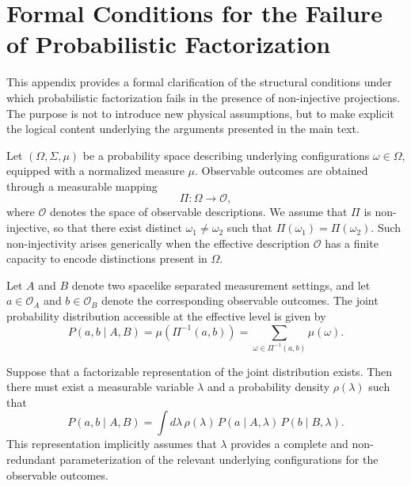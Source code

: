 \appendix
\section{Formal Conditions for the Failure of Probabilistic Factorization}
  \label{app:factorization}

  This appendix provides a formal clarification of the structural conditions under
  which probabilistic factorization fails in the presence of non-injective projections.
  The purpose is not to introduce new physical assumptions, but to make explicit the
  logical content underlying the arguments presented in the main text.

  Let $(\Omega,\Sigma,\mu)$ be a probability space describing underlying configurations
  $\omega \in \Omega$, equipped with a normalized measure $\mu$.
  Observable outcomes are obtained through a measurable mapping
  \begin{equation}
    \Pi : \Omega \rightarrow \mathcal{O},
  \end{equation}
  where $\mathcal{O}$ denotes the space of observable descriptions.
  We assume that $\Pi$ is non-injective, so that there exist distinct
  $\omega_1 \neq \omega_2$ such that $\Pi(\omega_1)=\Pi(\omega_2)$.
  Such non-injectivity arises generically when the effective description $\mathcal{O}$
  has a finite capacity to encode distinctions present in $\Omega$.

  Let $A$ and $B$ denote two spacelike separated measurement settings, and let
  $a \in \mathcal{O}_A$ and $b \in \mathcal{O}_B$ denote the corresponding observable
  outcomes.
  The joint probability distribution accessible at the effective level is given by
  \begin{equation}
    P(a,b \mid A,B)
    =
    \mu\!\left(\Pi^{-1}(a,b)\right)
    =
    \sum_{\omega \in \Pi^{-1}(a,b)} \mu(\omega).
  \end{equation}

  Suppose that a factorizable representation of the joint distribution exists.
  Then there must exist a measurable variable $\lambda$ and a probability density
  $\rho(\lambda)$ such that
  \begin{equation}
    P(a,b \mid A,B)
    =
    \int d\lambda\,
    \rho(\lambda)\,
    P(a \mid A,\lambda)\,
    P(b \mid B,\lambda).
    \label{eq:bell-factorization}
  \end{equation}
  This representation implicitly assumes that $\lambda$ provides a complete and
  non-redundant parameterization of the relevant underlying configurations for the
  observable outcomes.

